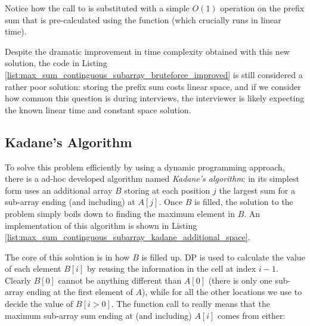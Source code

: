Notice how the call to  is substituted with a simple $O(1)$ operation on the prefix sum that is pre-calculated using the function  (which crucially runs in linear time).




Despite the dramatic improvement in time complexity obtained with this new solution, the code in Listing
\ref{list:max_sum_continguous_subarray_bruteforce_improved} is still considered a rather poor solution:
storing the prefix sum costs linear space, and  if we consider how common this question is during interviews, the interviewer is likely expecting the known linear time and constant space solution.

\subsection{Kadane's Algorithm}
\label{sec:kadane_algorithm}
To solve this problem efficiently by using a dynamic programming approach, there is a ad-hoc developed algorithm named \textit{Kadane’s algorithm}: in its simplest form uses an additional array $B$ storing at each position $j$ the largest sum for a sub-array ending (and including) at $A[j]$.
Once $B$ is filled, the solution to the problem simply boils down to finding the maximum element in $B$.
An implementation of this algorithm is shown 
in Listing \ref{list:max_sum_continguous_subarray_kadane_additional_space}.



The core of this solution is in how $B$ is filled up. DP is used to calculate the value of each element $B[i]$ by reusing the information in the cell at index $i-1$. Clearly $B[0]$ cannot be anything different than $A[0]$ (there is only one sub-array ending at the first element of $A$), while for all the other locations we use  to decide the value of $B[i > 0 ]$. 
The function call to  really means that the maximum sub-array sum ending at (and including) $A[i]$ comes from either:


